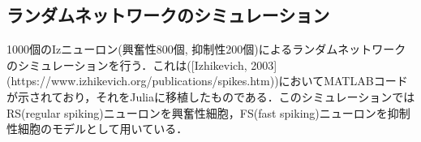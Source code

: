 \subsection{ランダムネットワークのシミュレーション}
1000個のIzニューロン(興奮性800個, 抑制性200個)によるランダムネットワークのシミュレーションを行う．これは([Izhikevich, 2003](https://www.izhikevich.org/publications/spikes.htm))においてMATLABコードが示されており，それをJuliaに移植したものである．このシミュレーションではRS(regular spiking)ニューロンを興奮性細胞，FS(fast spiking)ニューロンを抑制性細胞のモデルとして用いている．
